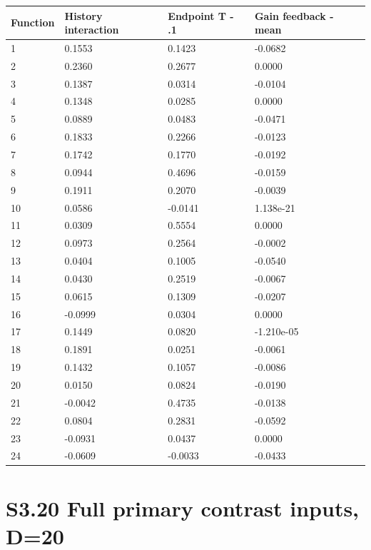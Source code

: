 \documentclass[11pt,a4paper]{article}
\begin{document}
\par\noindent\begin{minipage}{\linewidth}

\begin{longtable}[]{@{}llll@{}}
\toprule
Function & History interaction & Endpoint T - .1 & Gain feedback -
mean \\
\midrule
\endhead
1 & 0.1553 & 0.1423 & -0.0682 \\
2 & 0.2360 & 0.2677 & 0.0000 \\
3 & 0.1387 & 0.0314 & -0.0104 \\
4 & 0.1348 & 0.0285 & 0.0000 \\
5 & 0.0889 & 0.0483 & -0.0471 \\
6 & 0.1833 & 0.2266 & -0.0123 \\
7 & 0.1742 & 0.1770 & -0.0192 \\
8 & 0.0944 & 0.4696 & -0.0159 \\
9 & 0.1911 & 0.2070 & -0.0039 \\
10 & 0.0586 & -0.0141 & 1.138e-21 \\
11 & 0.0309 & 0.5554 & 0.0000 \\
12 & 0.0973 & 0.2564 & -0.0002 \\
13 & 0.0404 & 0.1005 & -0.0540 \\
14 & 0.0430 & 0.2519 & -0.0067 \\
15 & 0.0615 & 0.1309 & -0.0207 \\
16 & -0.0999 & 0.0304 & 0.0000 \\
17 & 0.1449 & 0.0820 & -1.210e-05 \\
18 & 0.1891 & 0.0251 & -0.0061 \\
19 & 0.1432 & 0.1057 & -0.0086 \\
20 & 0.0150 & 0.0824 & -0.0190 \\
21 & -0.0042 & 0.4735 & -0.0138 \\
22 & 0.0804 & 0.2831 & -0.0592 \\
23 & -0.0931 & 0.0437 & 0.0000 \\
24 & -0.0609 & -0.0033 & -0.0433 \\
\bottomrule
\end{longtable}

\end{minipage}\par

\newpage

\hypertarget{s3.20-full-primary-contrast-inputs-d20}{%
\section{S3.20 Full primary contrast inputs,
D=20}\label{s3.20-full-primary-contrast-inputs-d20}}
\end{document}
